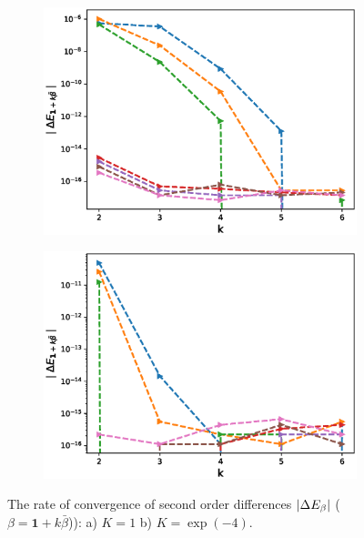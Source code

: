 \documentclass[11pt]{article}
\begin{document}
\begin{figure}[h!]
\centering
\begin{subfigure}{.5\textwidth}
\centering
\includegraphics[width=1\linewidth]{./figures/mixed_diff_second_way/H_043/N_16/mixed_difference_order2_rbergomi_16steps_H_043_K_1.eps}
\caption{}
\label{fig:sub3}
\end{subfigure}%
\begin{subfigure}{.5\textwidth}
\centering
\includegraphics[width=1\linewidth]{./figures/mixed_diff_second_way/H_043/N_16/mixed_difference_order2_rbergomi_16steps_H_043_K_exp__4.eps}
\caption{}
\label{fig:sub4}
\end{subfigure}

\caption{The rate of convergence of  second order differences $\left\lvert\Delta E_{\beta}\right\rvert$ ($\beta=\mathbf{1}+k \bar{\beta}$)): a) $K=1$ b)  $K=\operatorname{exp}(-4).$}
\label{fig:test2}
\end{figure}
\end{document}
